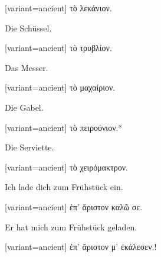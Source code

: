\switchcolumn

\begin{greek}[variant=ancient]%
τὸ λεκάνιον.

\end{greek}%
\switchcolumn*

Die Schüssel.

\switchcolumn

\begin{greek}[variant=ancient]%
τὸ τρυβλίον.

\end{greek}%
\switchcolumn*

Das Messer.

\switchcolumn

\begin{greek}[variant=ancient]%
τὸ μαχαίριον.

\end{greek}%
\switchcolumn*

Die Gabel.

\switchcolumn

\begin{greek}[variant=ancient]%
τὸ πειρούνιον.{*}

\end{greek}%
\switchcolumn*

Die Serviette.

\switchcolumn

\begin{greek}[variant=ancient]%
τὸ χειρόμακτρον.

\end{greek}%
\indent Ich lade dich zum Frühstück ein.

\switchcolumn

\begin{greek}[variant=ancient]%
ἐπ' ἄριστον καλῶ σε.

\end{greek}%
\switchcolumn*

Er hat mich zum Frühstück geladen.

\switchcolumn

\begin{greek}[variant=ancient]%
ἐπ' ἄριστον μ' ἐκάλεσεν.!

\end{greek}%
\switchcolumn*

